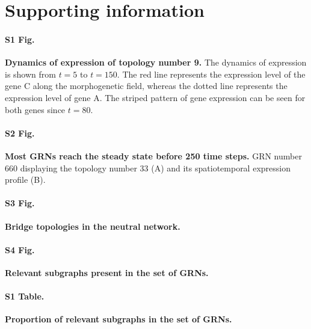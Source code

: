 \documentclass[10pt,letterpaper]{article}
\begin{document}


\section*{Supporting information}


\paragraph*{S1 Fig.}
\label{S1_Fig}
{\bf Dynamics of expression of topology number 9.}
The dynamics of expression is shown from $t = 5$ to $t = 150$. The red line
represents the expression level of the gene C along the morphogenetic field,
whereas the dotted line represents the expression level of gene A. The
striped pattern of gene expression can be seen for both genes since $t = 80$.

\paragraph*{S2 Fig.}
\label{S2_Fig}
{\bf Most GRNs reach the steady state before 250 time steps.}
GRN number 660 displaying the topology number 33 (A) and its spatiotemporal
expression profile (B).

\paragraph*{S3 Fig.}
\label{S3_Fig}
{\bf Bridge topologies in the neutral network.}

\paragraph*{S4 Fig.}
\label{S4_Fig}
{\bf Relevant subgraphs present in the set of GRNs.}

\paragraph*{S1 Table.}
\label{S1_Table}
{\bf Proportion of relevant subgraphs in the set of GRNs.}
\end{document}
